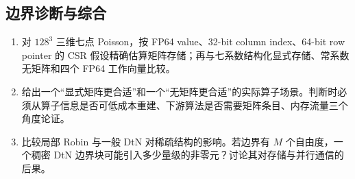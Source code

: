 \subsection*{边界诊断与综合}
\begin{enumerate}[label=\arabic*.]
\item 对 $128^3$ 三维七点 Poisson，按 FP64 value、32-bit column index、64-bit row pointer 的 CSR 假设精确估算矩阵存储；再与七系数结构化显式存储、常系数无矩阵和四个 FP64 工作向量比较。
\item 给出一个“显式矩阵更合适”和一个“无矩阵更合适”的实际算子场景。判断时必须从算子信息是否可低成本重建、下游算法是否需要矩阵条目、内存流量三个角度论证。
\item 比较局部 Robin 与一般 DtN 对稀疏结构的影响。若边界有 $M$ 个自由度，一个稠密 DtN 边界块可能引入多少量级的非零元？讨论其对存储与并行通信的后果。
\end{enumerate}
